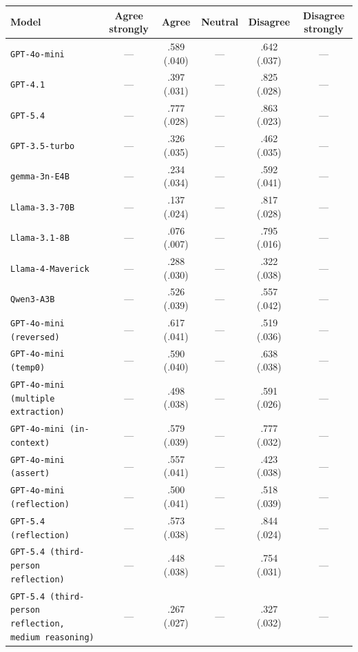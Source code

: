 \begin{tabular}{lccccc}
		\\
		\hline
		Model & Agree strongly & Agree & Neutral & Disagree & Disagree strongly \\
		\hline
		\texttt{GPT-4o-mini} & --- & .589 (.040) & --- & .642 (.037) & --- \\
		\texttt{GPT-4.1} & --- & .397 (.031) & --- & .825 (.028) & --- \\
		\texttt{GPT-5.4} & --- & .777 (.028) & --- & .863 (.023) & --- \\
		\texttt{GPT-3.5-turbo} & --- & .326 (.035) & --- & .462 (.035) & --- \\
		\texttt{gemma-3n-E4B} & --- & .234 (.034) & --- & .592 (.041) & --- \\
		\texttt{Llama-3.3-70B} & --- & .137 (.024) & --- & .817 (.028) & --- \\
		\texttt{Llama-3.1-8B} & --- & .076 (.007) & --- & .795 (.016) & --- \\
		\texttt{Llama-4-Maverick} & --- & .288 (.030) & --- & .322 (.038) & --- \\
		\texttt{Qwen3-A3B} & --- & .526 (.039) & --- & .557 (.042) & --- \\
		\texttt{GPT-4o-mini (reversed)} & --- & .617 (.041) & --- & .519 (.036) & --- \\
		\texttt{GPT-4o-mini (temp0)} & --- & .590 (.040) & --- & .638 (.038) & --- \\
		\texttt{GPT-4o-mini (multiple extraction)} & --- & .498 (.038) & --- & .591 (.026) & --- \\
		\texttt{GPT-4o-mini (in-context)} & --- & .579 (.039) & --- & .777 (.032) & --- \\
		\texttt{GPT-4o-mini (assert)} & --- & .557 (.041) & --- & .423 (.038) & --- \\
		\texttt{GPT-4o-mini (reflection)} & --- & .500 (.041) & --- & .518 (.039) & --- \\
		\texttt{GPT-5.4 (reflection)} & --- & .573 (.038) & --- & .844 (.024) & --- \\
		\texttt{GPT-5.4 (third-person reflection)} & --- & .448 (.038) & --- & .754 (.031) & --- \\
		\texttt{GPT-5.4 (third-person reflection, medium reasoning)} & --- & .267 (.027) & --- & .327 (.032) & --- \\
		\hline
\end{tabular}
